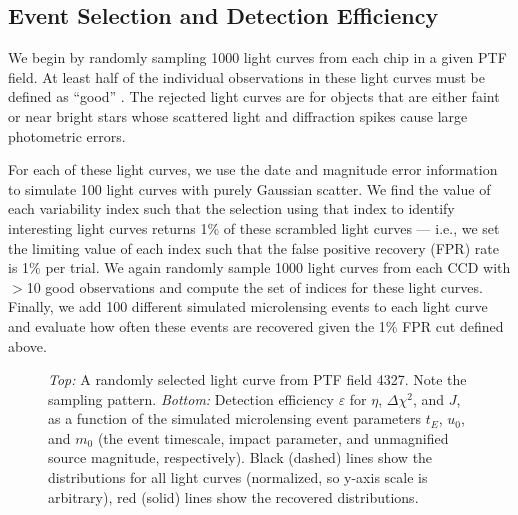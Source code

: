 \documentclass{emulateapj}
\begin{document}
\subsection{Event Selection and Detection Efficiency} \label{sec:detection_eff}
We begin by randomly sampling 1000 light curves from each chip in a given PTF field. At least half of the individual observations in these light curves must be defined as ``good'' \citep[see description of processing pipeline in][]{nick2009}. The rejected light curves are for objects that are either faint or near bright stars whose scattered light and diffraction spikes cause large photometric errors. 

For each of these light curves, we use the date and magnitude error information to simulate 100 light curves with purely Gaussian scatter. We find the value of each variability index such that the selection using that index to identify interesting light curves returns 1\% of these scrambled light curves --- i.e., we set the limiting value of each index such that the false positive recovery (FPR) rate is 1\% per trial. We again randomly sample 1000 light curves from each CCD with $>$10 good observations and compute the set of indices for these light curves. Finally, we add 100 different simulated microlensing events to each light curve and evaluate how often these events are recovered given the 1\% FPR cut defined above. 

\begin{figure}
\centering
	
\caption{{\it Top:} A randomly selected light curve from PTF field 4327. Note the sampling pattern. {\it Bottom:} Detection efficiency $\varepsilon$ for $\eta$, $\Delta\chi^2$, and $J$, as a function of the simulated microlensing event parameters $t_E$, $u_0$, and $m_0$ (the event timescale, impact parameter, and unmagnified source magnitude, respectively). Black (dashed) lines show the distributions for all light curves (normalized, so y-axis scale is arbitrary), red (solid) lines show the recovered distributions.}  \label{fig:detection_efficiency_4327}
\end{figure}
\end{document}
